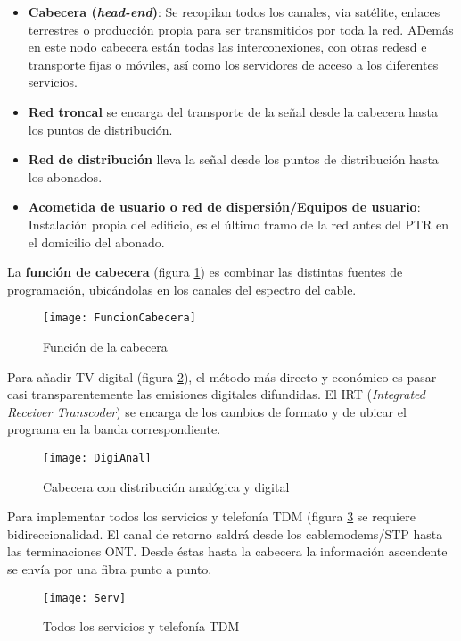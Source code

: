 \documentclass[10pt,portrait, twocolumn]{article}
\begin{document}
	\begin{itemize}
		\item \textbf{Cabecera (\textit{head-end})}: Se recopilan todos los canales, via satélite, enlaces terrestres o producción propia para ser transmitidos por toda la red. ADemás en este nodo cabecera están todas las interconexiones, con otras redesd e transporte fijas o móviles, así como los servidores de acceso a los diferentes servicios.
		\item \textbf{Red troncal} se encarga del transporte de la señal desde la cabecera hasta los puntos de distribución.
		\item \textbf{Red de distribución} lleva la señal desde los puntos de distribución hasta los abonados.
		\item \textbf{Acometida de usuario o red de dispersión/Equipos de usuario}: Instalación propia del edificio, es el último tramo de la red antes del PTR en el domicilio del abonado.
	\end{itemize}
	
La \textbf{función de cabecera} (figura \ref{fig:FuncionCabecera}) es combinar las distintas fuentes de programación, ubicándolas en los canales del espectro del cable.

\begin{figure}[!ht]	
	\centering
    	\texttt{[image: FuncionCabecera]}
	\caption{Función de la cabecera}
	\label{fig:FuncionCabecera}
\end{figure}    

Para añadir TV digital (figura \ref{fig:Anal}), el método más directo y económico es pasar casi transparentemente las emisiones digitales difundidas. El IRT (\textit{Integrated Receiver Transcoder}) se encarga de los cambios de formato y de ubicar el programa en la banda correspondiente.

\begin{figure}[!ht]	
	\centering
    	\texttt{[image: DigiAnal]}
	\caption{Cabecera con distribución analógica y digital}
	\label{fig:Anal}
\end{figure}    

Para implementar todos los servicios y telefonía TDM (figura \ref{fig:Serv} se requiere bidireccionalidad. El canal de retorno saldrá desde los cablemodems/STP hasta las terminaciones ONT. Desde éstas hasta la cabecera la información ascendente se envía por una fibra punto a punto.

\begin{figure}[!ht]	
	\centering
    	\texttt{[image: Serv]}
	\caption{Todos los servicios y telefonía TDM}
	\label{fig:Serv}
\end{figure}    
\end{document}
